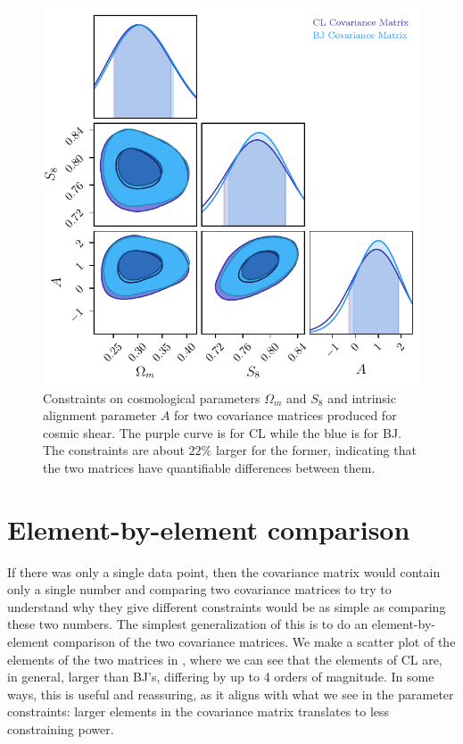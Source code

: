 \documentclass[twocolumn]{\docclass}
\begin{document}
	\begin{figure}
		\includegraphics[width=0.9\columnwidth]{Y1_Comparison/Y1_om-S8A.pdf}
		\caption{Constraints on cosmological parameters $\Omega_m$ and $S_8$ and intrinsic alignment parameter $A$ for two covariance matrices produced for cosmic shear. The purple curve is for CL while the blue is for BJ. The constraints are about $22\%$ larger for the former, indicating that the two matrices have quantifiable differences between them. \label{fig:y3-comparison}}
	\end{figure}
	
	
	
	\section{Element-by-element comparison}
	
	If there was only a single data point, then the covariance matrix would contain only a single number and comparing two covariance matrices to try to understand why they give different constraints would be as simple as comparing these two numbers.  The simplest generalization of this is to do an element-by-element comparison of the two covariance matrices.
	We make a scatter plot of the elements of the two matrices in , where we can see that the elements of CL are, in general, larger than BJ's, differing by up to 4 orders of magnitude. In some ways, this is useful and reassuring, as it aligns with what we see in the parameter constraints: larger elements in the covariance matrix translates to less constraining power.
	
\end{document}

